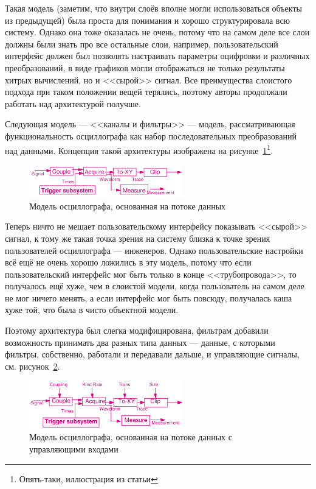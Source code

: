 \documentclass[a5paper]{article}
\begin{document}
Такая модель (заметим, что внутри слоёв вполне могли использоваться объекты из предыдущей) была проста для понимания и хорошо структурировала всю систему. Однако она тоже оказалась не очень, потому что на самом деле все слои должны были знать про все остальные слои, например, пользовательский интерфейс должен был позволять настраивать параметры оцифровки и различных преобразований, в виде графиков могли отображаться не только результаты хитрых вычислений, но и <<сырой>> сигнал. Все преимущества слоистого подхода при таком положении вещей терялись, поэтому авторы продолжали работать над архитектурой получше.

Следующая модель --- <<каналы и фильтры>> --- модель, рассматривающая функциональность осциллографа как набор последовательных преобразований над данными. Концепция такой архитектуры изображена на рисунке~\ref{figure:oscilloscopeFilters}\footnote{Опять-таки, иллюстрация из статьи}.

\begin{figure}
	\begin{center}
		\includegraphics[width=0.6\textwidth]{oscilloscopeFilters.png}
	\end{center}
	\caption{Модель осциллографа, основанная на потоке данных}
	\label{figure:oscilloscopeFilters}
\end{figure}

Теперь ничто не мешает пользовательскому интерфейсу показывать <<сырой>> сигнал, к тому же такая точка зрения на систему близка к точке зрения пользователей осциллографа --- инженеров. Однако пользовательские настройки всё ещё не очень хорошо ложились в эту модель, потому что если пользовательский интерфейс мог быть только в конце <<трубопровода>>, то получалось ещё хуже, чем в слоистой модели, когда пользователь на самом деле не мог ничего менять, а если интерфейс мог быть повсюду, получалась каша хуже той, что была в чисто объектной модели.

Поэтому архитектура был слегка модифицирована, фильтрам добавили возможность принимать два разных типа данных --- данные, с которыми фильтры, собственно, работали и передавали дальше, и управляющие сигналы, см. рисунок~\ref{figure:oscilloscopeModifiedFilters}.

\begin{figure}
	\begin{center}
		\includegraphics[width=0.6\textwidth]{oscilloscopeModifiedFilters.png}
	\end{center}
	\caption{Модель осциллографа, основанная на потоке данных с управляющими входами}
	\label{figure:oscilloscopeModifiedFilters}
\end{figure}
\end{document}
